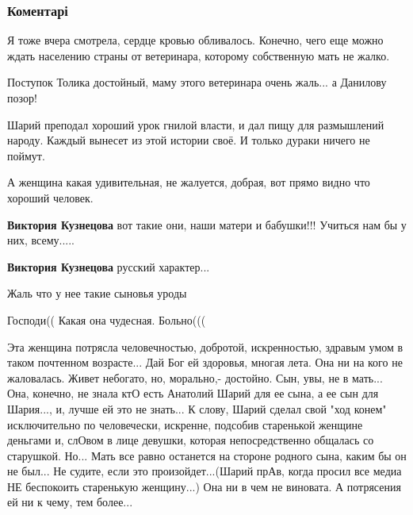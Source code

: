  
 
 
 
 
\subsubsection{Коментарі}
\label{sec:30_11_2021.fb.dudkin_jurij.1.danilovschina.cmt}

\begin{itemize} %

Я тоже вчера смотрела, сердце кровью обливалось. Конечно, чего еще можно ждать
населению страны от ветеринара, которому собственную мать не жалко.


Поступок Толика достойный, маму этого ветеринара очень жаль... а Данилову позор!

Шарий преподал хороший урок гнилой власти, и дал пищу для размышлений народу.
Каждый вынесет из этой истории своё. И только дураки ничего не поймут.

А женщина какая удивительная, не жалуется, добрая, вот прямо видно что хороший человек.

\begin{itemize} %
\textbf{Виктория Кузнецова} вот такие они, наши матери и бабушки!!! Учиться нам бы у них, всему.....

\textbf{Виктория Кузнецова} русский характер...

Жаль что у нее такие сыновья уроды
\end{itemize} %

Господи(( Какая она чудесная. Больно(((


Эта женщина потрясла человечностью, добротой, искренностью, здравым умом в
таком почтенном возрасте... Дай Бог ей здоровья, многая лета. Она ни на кого не
жаловалась. Живет небогато, но, морально,- достойно. Сын, увы, не в мать...
Она, конечно, не знала ктО есть Анатолий Шарий для ее сына, а ее сын для
Шария..., и, лучше ей это не знать... К слову, Шарий сделал свой "ход конем"
исключительно по человечески, искренне, подсобив старенькой женщине деньгами и,
слОвом в лице девушки, которая непосредственно общалась со старушкой. Но... Мать
все равно останется на стороне родного сына, каким бы он не был... Не судите,
если это произойдет...(Шарий прАв, когда просил все медиа НЕ беспокоить
старенькую женщину...) Она ни в чем не виновата. А потрясения ей ни к чему, тем
более...



\end{itemize}
